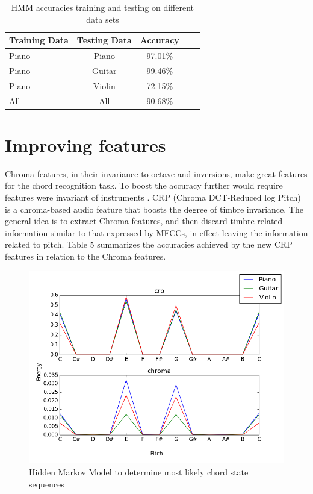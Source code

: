 \documentclass{article}
\begin{document}
\begin{table}[t]
\caption{HMM accuracies training and testing on different data sets}
\label{hmmacc}
\vskip 0.15in
\begin{center}
\begin{small}
\begin{sc}
\begin{tabular}{lcccr}
\hline
\abovespace\belowspace
Training Data & Testing Data & Accuracy \\
\hline
\abovespace
Piano & Piano & 97.01\%\\
Piano & Guitar & 99.46\%\\
Piano & Violin & 72.15\%\\
All & All & 90.68\%\\
\hline
\end{tabular}
\end{sc}
\end{small}
\end{center}
\vskip -0.1in
\end{table}

\section{Improving features}

Chroma features, in their invariance to octave and inversions, make great
features for the chord recognition task. To boost the accuracy further would
require features were invariant of instruments \cite{jiang}. CRP (Chroma
DCT-Reduced log Pitch) is a chroma-based audio feature that boosts the degree of
timbre invariance. The general idea is to extract Chroma features, and then
discard timbre-related information similar to that expressed by MFCCs, in effect
leaving the information related to pitch. Table 5 summarizes the accuracies
achieved by the new CRP features in relation to the Chroma features.

\begin{figure}[ht]
\vskip 0.2in
\begin{center}
\centerline{\includegraphics[width=\columnwidth]{chromacrp}}
\caption{Hidden Markov Model to determine most likely chord state sequences}
\label{icml-historical}
\end{center}
\vskip -0.2in
\end{figure}
\end{document}
